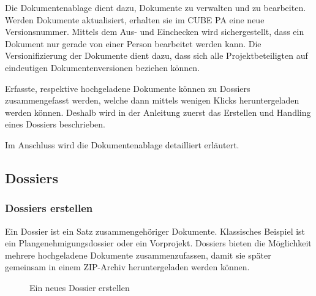 \vspace{\baselineskip}

Die Dokumentenablage dient dazu, Dokumente zu verwalten und zu bearbeiten. Werden Dokumente aktualisiert, erhalten sie im CUBE PA eine neue Versionsnummer. Mittels dem Aus- und Einchecken wird sichergestellt, dass ein Dokument nur gerade von einer Person bearbeitet werden kann. Die Versionifizierung der Dokumente dient dazu, dass sich alle Projektbeteiligten auf eindeutigen Dokumentenversionen beziehen können. 

\vspace{1cm}  

Erfasste, respektive hochgeladene Dokumente können zu Dossiers zusammengefasst werden, welche dann mittels wenigen Klicks heruntergeladen werden können. Deshalb wird in der Anleitung zuerst das Erstellen und Handling eines Dossiers beschrieben.

\vspace{\baselineskip}

Im Anschluss wird die Dokumentenablage detailliert erläutert.

\subsection{Dossiers}
\label{bkm:Ref442544219}
\subsubsection{Dossiers erstellen}

Ein Dossier ist ein Satz zusammengehöriger Dokumente. Klassisches Beispiel ist ein Plangenehmigungsdossier oder ein Vorprojekt. Dossiers bieten die Möglichkeit mehrere hochgeladene Dokumente zusammenzufassen, damit sie später gemeinsam in einem ZIP-Archiv heruntergeladen werden können.

\begin{figure}[H]
\caption{Ein neues Dossier erstellen}
\end{figure}

